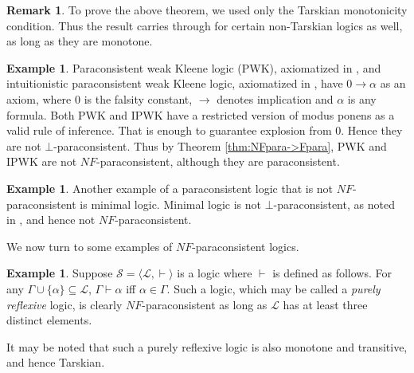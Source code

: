 \documentclass[submission]{eptcs}
\newcommand{\lang}{\mathcal{L}}
\newcommand{\limp}{\longrightarrow}
\theoremstyle{definition}
\newtheorem{rem}[thm]{Remark}
\newtheorem{exa}[thm]{Example}
\begin{document}
\begin{rem}
To prove the above theorem, we used only the Tarskian monotonicity condition. Thus the result carries through for certain non-Tarskian logics as well, as long as they are monotone.
\end{rem}

\begin{exa}\label{exm:PWK-NotNFpara}
Paraconsistent weak Kleene logic (PWK), axiomatized in \cite{Bonzio2017}, and intuitionistic paraconsistent weak Kleene logic, axiomatized in \cite{BasuChakraborty2021}, have $0\limp\alpha$ as an axiom, where 0 is the falsity constant, $\limp$ denotes implication and $\alpha$ is any formula. Both PWK and IPWK have a restricted version of modus ponens as a valid rule of inference. That is enough to guarantee explosion from 0. Hence they are not $\bot$-paraconsistent. Thus by Theorem \ref{thm:NFpara->Fpara}, PWK and IPWK are not $NF$-paraconsistent, although they are paraconsistent. 
\end{exa}

\begin{exa}\label{exm:Min-NotNFpara}
Another example of a paraconsistent logic that is not $NF$-paraconsistent is minimal logic. Minimal logic is not $\bot$-paraconsistent, as noted in \cite{Robles2009}, and hence not $NF$-paraconsistent.
\end{exa}

We now turn to some examples of $NF$-paraconsistent logics.

\begin{exa}
Suppose $\mathcal{S}=\langle\lang,\vdash\rangle$ is a logic where $\vdash$ is defined as follows. For any $\Gamma\cup\{\alpha\}\subseteq\lang$,
$\Gamma\vdash\alpha$ iff $\alpha\in\Gamma$. Such a logic, which may be called a \emph{purely reflexive} logic, is clearly $NF$-paraconsistent as long as $\lang$ has at least three distinct elements.

It may be noted that such a purely reflexive logic is also monotone and transitive, and hence Tarskian.
\end{exa}
\end{document}
